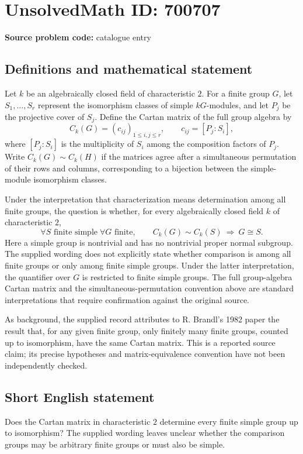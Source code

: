 \documentclass[11pt]{article}
\begin{document}
\section*{UnsolvedMath ID: 700707}
\textbf{Source problem code:} catalogue entry
\subsection{Definitions and mathematical statement}
Let \(k\) be an algebraically closed field of characteristic \(2\). For a finite group \(G\), let \(S_1,\ldots,S_r\) represent the isomorphism classes of simple \(kG\)-modules, and let \(P_j\) be the projective cover of \(S_j\). Define the Cartan matrix of the full group algebra by
\[
C_k(G)=(c_{ij})_{1\leq i,j\leq r},\qquad c_{ij}=[P_j:S_i],
\]
where \([P_j:S_i]\) is the multiplicity of \(S_i\) among the composition factors of \(P_j\). Write \(C_k(G)\sim C_k(H)\) if the matrices agree after a simultaneous permutation of their rows and columns, corresponding to a bijection between the simple-module isomorphism classes.

Under the interpretation that characterization means determination among all finite groups, the question is whether, for every algebraically closed field \(k\) of characteristic \(2\),
\[
\forall S\text{ finite simple}\;\forall G\text{ finite},\qquad
C_k(G)\sim C_k(S)\ \Longrightarrow\ G\cong S.
\]
Here a simple group is nontrivial and has no nontrivial proper normal subgroup. The supplied wording does not explicitly state whether comparison is among all finite groups or only among finite simple groups. Under the latter interpretation, the quantifier over \(G\) is restricted to finite simple groups. The full group-algebra Cartan matrix and the simultaneous-permutation convention above are standard interpretations that require confirmation against the original source.

As background, the supplied record attributes to R. Brandl's 1982 paper the result that, for any given finite group, only finitely many finite groups, counted up to isomorphism, have the same Cartan matrix. This is a reported source claim; its precise hypotheses and matrix-equivalence convention have not been independently checked.
\subsection{Short English statement}
Does the Cartan matrix in characteristic \(2\) determine every finite simple group up to isomorphism? The supplied wording leaves unclear whether the comparison groups may be arbitrary finite groups or must also be simple.
\end{document}

